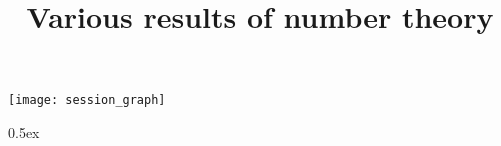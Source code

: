 \documentclass[11pt,a4paper]{article}
\begin{document}
\title{Various results of number theory}
\maketitle

\tableofcontents

\begin{center}
  \texttt{[image: session\_graph]}
\end{center}

\newpage

\parindent 0pt\parskip 0.5ex





\end{document}

